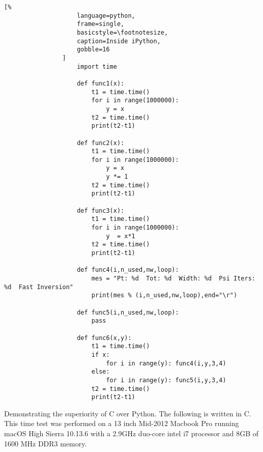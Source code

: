 \documentclass[crop=false,class=book,oneside]{standalone}
\begin{document}
                \begin{lstlisting}[%
                    language=python,
                    frame=single,
                    basicstyle=\footnotesize,
                    caption=Inside iPython,
                    gobble=16
                ]
                    import time
                    
                    def func1(x):
                    	t1 = time.time()
                    	for i in range(1000000):
                    		y = x
                    	t2 = time.time()
                    	print(t2-t1)
                    
                    def func2(x):
                    	t1 = time.time()
                    	for i in range(1000000):
                    		y = x
                    		y *= 1
                    	t2 = time.time()
                    	print(t2-t1)
                    
                    def func3(x):
                        t1 = time.time()
                        for i in range(1000000):
                            y  = x*1
                        t2 = time.time()
                        print(t2-t1)
                    
                    def func4(i,n_used,nw,loop):
                        mes = "Pt: %d  Tot: %d  Width: %d  Psi Iters: %d  Fast Inversion"
                        print(mes % (i,n_used,nw,loop),end="\r")
                    
                    def func5(i,n_used,nw,loop):
                    	pass
                    
                    def func6(x,y):
                    	t1 = time.time()
                    	if x:
                    		for i in range(y): func4(i,y,3,4)
                    	else:
                    		for i in range(y): func5(i,y,3,4)
                    	t2 = time.time()
                    	print(t2-t1)
                \end{lstlisting}
                Demonstrating the superiority of C over Python.
                The following is written in C. This time test was
                performed on a 13 inch Mid-2012 Macbook Pro running macOS
                High Sierra 10.13.6 with a 2.9GHz duo-core intel i7
                processor and 8GB of 1600 MHz DDR3 memory.
                \newpage
\end{document}
